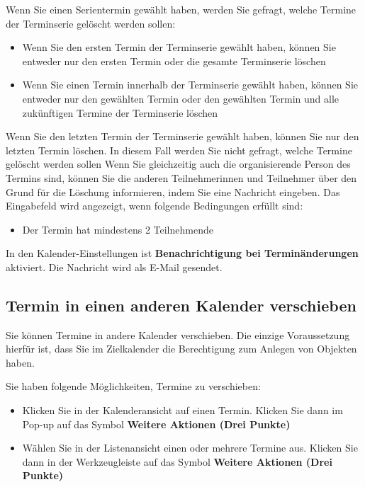 \documentclass[
  letterpaper,
  DIV=11,
  numbers=noendperiod]{scrreprt}
\providecommand{\tightlist}{%
  \setlength{\itemsep}{0pt}\setlength{\parskip}{0pt}}\usepackage{longtable,booktabs,array}
\begin{document}
Wenn Sie einen Serientermin gewählt haben, werden Sie gefragt, welche
Termine der Terminserie gelöscht werden sollen:

\begin{itemize}
\tightlist
\item
  Wenn Sie den ersten Termin der Terminserie gewählt haben, können Sie
  entweder nur den ersten Termin oder die gesamte Terminserie löschen
\item
  Wenn Sie einen Termin innerhalb der Terminserie gewählt haben, können
  Sie entweder nur den gewählten Termin oder den gewählten Termin und
  alle zukünftigen Termine der Terminserie löschen
\end{itemize}

Wenn Sie den letzten Termin der Terminserie gewählt haben, können Sie
nur den letzten Termin löschen. In diesem Fall werden Sie nicht gefragt,
welche Termine gelöscht werden sollen Wenn Sie gleichzeitig auch die
organisierende Person des Termins sind, können Sie die anderen
Teilnehmerinnen und Teilnehmer über den Grund für die Löschung
informieren, indem Sie eine Nachricht eingeben. Das Eingabefeld wird
angezeigt, wenn folgende Bedingungen erfüllt sind:

\begin{itemize}
\tightlist
\item
  Der Termin hat mindestens 2 Teilnehmende
\end{itemize}

In den Kalender-Einstellungen ist \textbf{Benachrichtigung bei
Terminänderungen} aktiviert. Die Nachricht wird als E-Mail gesendet.

\subsection{Termin in einen anderen Kalender
verschieben}\label{termin-in-einen-anderen-kalender-verschieben}

Sie können Termine in andere Kalender verschieben. Die einzige
Voraussetzung hierfür ist, dass Sie im Zielkalender die Berechtigung zum
Anlegen von Objekten haben.

Sie haben folgende Möglichkeiten, Termine zu verschieben:

\begin{itemize}
\tightlist
\item
  Klicken Sie in der Kalenderansicht auf einen Termin. Klicken Sie dann
  im Pop-up auf das Symbol \textbf{Weitere Aktionen (Drei Punkte)}
\item
  Wählen Sie in der Listenansicht einen oder mehrere Termine aus.
  Klicken Sie dann in der Werkzeugleiste auf das Symbol \textbf{Weitere
  Aktionen (Drei Punkte)}
\end{itemize}
\end{document}

